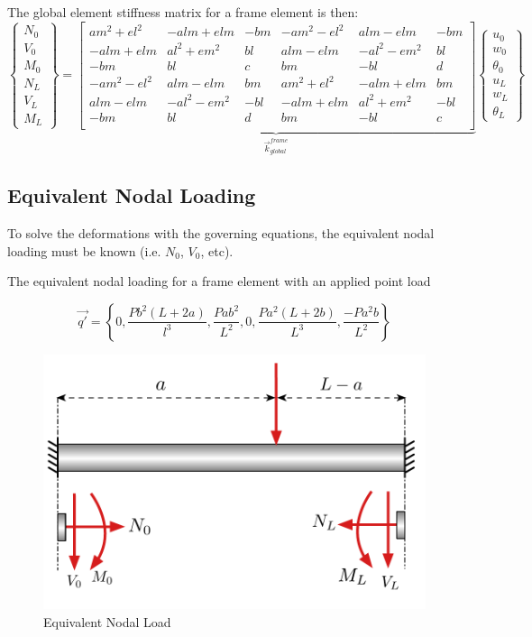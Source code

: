 \newpage



\begin{strip}
The global element stiffness matrix for a frame element is then:
	\begin{equation}
		\begin{Bmatrix}
			N_0\\ V_0\\ M_0\\ \hline N_L\\ V_L\\ M_L
		\end{Bmatrix}
	=
	\underbrace{
		\left[
		\begin{array}{c|cc|c|cc}
			am^2 + el^2&-alm + elm&-bm&-am^2 - el^2&alm - elm&-bm\\ \hline
			-alm + elm&al^2 + em^2&bl&alm - elm&-al^2 - em^2&bl\\
			-bm&bl&c&bm&-bl&d\\ \hline
			-am^2 - el^2&alm - elm&bm&am^2 + el^2&-alm + elm&bm\\ \hline
			alm - elm&-al^2 - em^2&-bl&-alm + elm&al^2 + em^2&-bl\\
			-bm&bl&d&bm&-bl&c\\
		\end{array}
		\right]
		}_{\displaystyle{\vec{k}_{global}^{frame}}}
		\begin{Bmatrix}
			u_0\\ w_0\\ \theta_0\\ \hline u_L\\ w_L\\ \theta_L
		\end{Bmatrix}
	\end{equation}
\end{strip}


\subsection{Equivalent Nodal Loading}
To solve the deformations with the governing equations, the equivalent nodal loading must be known (i.e. $N_0$, $V_0$, etc). 

The equivalent nodal loading for a frame element with an applied point load

\begin{equation}
	\vec{q'} = \left\{ 
	0,
	\frac{Pb^2(L+2a)}{l^3},
	\frac{Pab^2}{L^2},
	0,
	\frac{Pa^2(L+2b)}{L^3},
	\frac{-Pa^2b}{L^2}
	\right\}
\end{equation}

\begin{figure}[h]	\centerline{\includegraphics[width=0.5\columnwidth]{Figures/EqPointLoad}}
	\caption{Equivalent Nodal Load}
	\label{fig:EqPointLoad}
\end{figure}